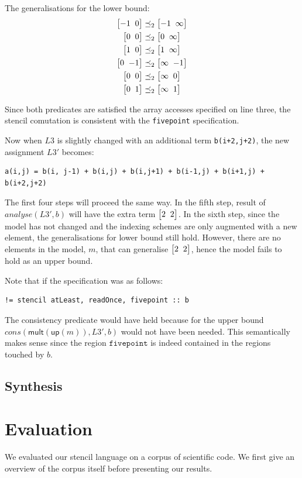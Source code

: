 \documentclass[9pt]{sigplanconf}
\theoremstyle{definition}
\newcommand{\vtwoh}[2]{\setlength{\arraycolsep}{0em}
\left[\begin{array}{cc}#1 \; & \; #2\end{array}\right]}
\begin{document}
\begin{enumerate}
  The generalisations for the lower bound:
  \begin{align*}
     \vtwoh{-1}{0} & \preceq_2 \vtwoh{-1}{\infty} \\
     \vtwoh{0}{0} & \preceq_2 \vtwoh{0}{\infty} \\
     \vtwoh{1}{0} & \preceq_2 \vtwoh{1}{\infty}  \\
     \vtwoh{0}{-1} & \preceq_2 \vtwoh{\infty}{-1} \\
     \vtwoh{0}{0} & \preceq_2 \vtwoh{\infty}{0} \\
     \vtwoh{0}{1} & \preceq_2 \vtwoh{\infty}{1}
  \end{align*}

  Since both predicates are satisfied the array accesses specified on line
  three, the stencil comutation is consistent with the \texttt{fivepoint}
  specification.
\end{enumerate}

Now when $L3$ is slightly changed with an additional term \texttt{b(i+2,j+2)},
the new assignment $L3'$ becomes:
%
\begin{verbatim}
a(i,j) = b(i, j-1) + b(i,j) + b(i,j+1) + b(i-1,j) + b(i+1,j) + b(i+2,j+2)
\end{verbatim}
%
The first four steps will proceed the same way. In the fifth step, result
of $\mathit{analyse}(L3',b)$ will have the extra term $\vtwoh{2}{2}$. In the
sixth step, since the model has not changed and the indexing schemes are only
augmented with a new element, the generalisations for lower bound still hold.
However, there are no elements in the model, $m$, that can generalise
$\vtwoh{2}{2}$, hence the model fails to hold as an upper bound.

Note that if the specification was as follows:
%
\begin{verbatim}
!= stencil atLeast, readOnce, fivepoint :: b
\end{verbatim}
%
The consistency predicate would have held because for the upper bound
$\mathit{cons}(\textsf{mult}(\textsf{up}(m)),L3',b)$ would not have
been needed. This semantically makes sense since the region
$\texttt{fivepoint}$ is indeed contained in the regions touched by $b$.

\subsection{Synthesis\label{subsec:synthesis}}

\section{Evaluation}
\label{sec:evaluation}
We evaluated our stencil language on a corpus of scientific code. We first give an overview of the corpus itself before presenting our results.
\end{document}
